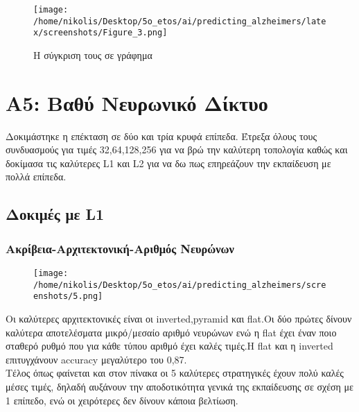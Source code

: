 \documentclass[a4paper,11pt]{article}
\begin{document}
\begin{figure}[H]
    \centering
    \texttt{[image: /home/nikolis/Desktop/5o\_etos/ai/predicting\_alzheimers/latex/screenshots/Figure\_3.png]}
    \caption{Η σύγκριση τους σε γράφημα}
    \label{fig:same}
\end{figure}

    

\newpage
\section{A5: Βαθύ Νευρωνικό Δίκτυο}
Δοκιμάστηκε η επέκταση σε δύο και τρία κρυφά επίπεδα. Έτρεξα όλους τους συνδυασμούς για τιμές 32,64,128,256 για να βρώ την καλύτερη τοπολογία καθώς και 
δοκίμασα τις καλύτερες L1  και L2 για να δω πως επηρεάζουν την εκπαίδευση με πολλά επίπεδα. \\

\subsection{Δοκιμές με L1}

\subsubsection{Ακρίβεια-Αρχιτεκτονική-Αριθμός Νευρώνων}

\begin{figure}[H]
    \centering
    \texttt{[image: /home/nikolis/Desktop/5o\_etos/ai/predicting\_alzheimers/screenshots/5.png]}
    \label{fig:double}
\end{figure}

Οι καλύτερες αρχιτεκτονικές είναι οι inverted,pyramid και flat.Οι δύο πρώτες δίνουν καλύτερα αποτελέσματα μικρό/μεσαίο αριθμό νευρώνων ενώ η flat 
έχει έναν ποιο σταθερό ρυθμό που για κάθε τύπου αριθμό έχει καλές τιμές.H flat και η inverted επιτυγχάνουν accuracy μεγαλύτερο του 0,87.\\
Τέλος όπως φαίνεται και στον πίνακα οι 5 καλύτερες στρατηγικές έχουν πολύ καλές μέσες τιμές, δηλαδή αυξάνουν την αποδοτικότητα γενικά της εκπαίδευσης σε 
σχέση με 1 επίπεδο, ενώ οι χειρότερες δεν δίνουν κάποια βελτίωση.
\end{document}
